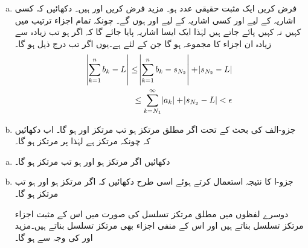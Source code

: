 \begin{enumerate}[a.]
\item
فرض کریں  ایک مثبت حقیقی عدد ہو۔ مزید فرض کریں  اور  ہیں۔  دکھائیں کہ کسی اشاریہ  کے لیے اور کسی اشاریہ  کے لیے 
 اور  ہوں گے۔ چونکہ تمام اجزاء   ترتیب  میں کہیں نہ کہیں پائے جاتے ہیں لہٰذا ایک ایسا اشاریہ  پایا جائے گا کہ اگر  ہو تب  زیادہ سے زیادہ   ان اجزاء  کا مجموعہ ہو گا جن کے لئے   ہے۔یوں اگر   تب  درج ذیل ہو گا۔
\begin{align*}
\abs{\sum_{k=1}^{n}b_k-L}\le \abs{\sum_{k=1}^{n}b_k-s_{N_2}}+\abs{s_{N_2}-L}\\
\le \sum_{k=N_1}^{\infty}\abs{a_k}+\abs{s_{N_2}-L}<\epsilon
\end{align*}
\item
جزو-الف کی بحث کے تحت اگر  مطلق مرتکز ہو تب  مرتکز اور
  ہو گا۔ اب دکھائیں کہ چونکہ  مرتکز ہے لہٰذا  پر  مرتکز ہو گا۔
\end{enumerate}
\begin{enumerate}[a.]
\item
دکھائیں اگر  مرتکز ہو اور  ہو تب  مرتکز ہو گا۔
\item
جزو-ا کا نتیجہ استعمال کرتے ہوئے اسی طرح دکھائیں کہ اگر  مرتکز ہو اور
  ہو تب   مرتکز ہو گا۔

دوسرے لفظوں میں مطلق مرتکز تسلسل کی صورت میں اس کے مثبت اجزاء   مرتکز تسلسل بناتے ہیں اور اس کے منفی اجزاء   بھی  مرتکز تسلسل بناتے ہیں۔مزید  اور  کی وجہ سے 
  ہو گا۔
\end{enumerate}

